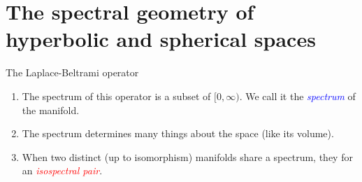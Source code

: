 \section{The spectral geometry of hyperbolic and spherical spaces}
\begin{frame}{The Laplace-Beltrami operator}
	\begin{enumerate}
		\begin{definition}
			a generalization of the Laplace operator to more general spaces
			\begin{align*}
				\Delta f \coloneq \divergence \nabla f.
			\end{align*}
		\end{definition}
		\item The spectrum of this operator is a subset of $[0, \infty)$. We call it the \textcolor{blue}{\emph{spectrum}} of the manifold.
		      \pause
		\item The spectrum determines many things about the space (like its volume).
		\item When two distinct (up to isomorphism) manifolds share a spectrum, they for an \textcolor{red}{\emph{isospectral pair}}.
	\end{enumerate}
\end{frame}

